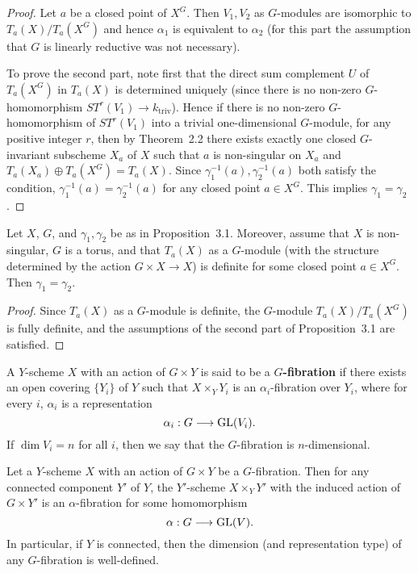 \documentclass[12pt]{article}
\begin{document}
\begin{proof}
Let $a$ be a closed point of $X^G$. Then $V_1, V_2$ as $G$-modules are isomorphic to $T_a(X)/T_a(X^G)$ and hence $\alpha_1$ is equivalent to $\alpha_2$ (for this part the assumption that $G$ is linearly reductive was not necessary).

To prove the second part, note first that the direct sum complement $U$ of $T_a(X^G)$ in $T_a(X)$ is determined uniquely (since there is no non-zero $G$-homomorphism $ST^r(V_1) \to k_{\mathrm{triv}}$). Hence if there is no non-zero $G$-homomorphism of $ST^r(V_1)$ into a trivial one-dimensional $G$-module, for any positive integer $r$, then by Theorem~2.2 there exists exactly one closed $G$-invariant subscheme $X_a$ of $X$ such that $a$ is non-singular on $X_a$ and $T_a(X_a) \oplus T_a(X^G) = T_a(X)$. Since $\gamma_1^{-1}(a), \gamma_2^{-1}(a)$ both satisfy the condition, $\gamma_1^{-1}(a) = \gamma_2^{-1}(a)$ for any closed point $a \in X^G$. This implies $\gamma_1 = \gamma_2$.
\end{proof}

\begin{corollary}
Let $X$, $G$, and $\gamma_1, \gamma_2$ be as in Proposition~3.1. Moreover, assume that $X$ is non-singular, $G$ is a torus, and that $T_a(X)$ as a $G$-module (with the structure determined by the action $G \times X \to X$) is definite for some closed point $a \in X^G$. Then $\gamma_1 = \gamma_2$.
\end{corollary}

\begin{proof}
Since $T_a(X)$ as a $G$-module is definite, the $G$-module $T_a(X)/T_a(X^G)$ is fully definite, and the assumptions of the second part of Proposition~3.1 are satisfied.
\end{proof}

\begin{definition}
[$G$-fibration]A $Y$-scheme $X$ with an action of $G \times Y$ is said to be a \textbf{$G$-fibration} if there exists an open covering $\{Y_i\}$ of $Y$ such that $X \times_Y Y_i$ is an $\alpha_i$-fibration over $Y_i$, where for every $i$, $\alpha_i$ is a representation
\[
   \alpha_i : G \longrightarrow \operatorname{GL}(V_i).
\]
If $\dim V_i = n$ for all $i$, then we say that the $G$-fibration is $n$-dimensional.
\end{definition}

\begin{proposition}[3.2]
Let a $Y$-scheme $X$ with an action of $G \times Y$ be a $G$-fibration. Then for any connected component $Y'$ of $Y$, the $Y'$-scheme $X \times_Y Y'$ with the induced action of $G \times Y'$ is an $\alpha$-fibration for some homomorphism
\[
   \alpha : G \longrightarrow \operatorname{GL}(V).
\]
In particular, if $Y$ is connected, then the dimension (and representation type) of any $G$-fibration is well-defined.
\end{proposition}
\end{document}
